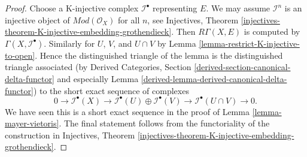 \documentclass[10pt,a4paper]{amsart}
\theoremstyle{plain}
\theoremstyle{definition}
\theoremstyle{remark}
\numberwithin{equation}{subsection}
\begin{document}
\begin{proof}
Choose a K-injective complex $\mathcal{I}^\bullet$
representing $E$. We may assume $\mathcal{I}^n$ is an injective
object of $\textit{Mod}(\mathcal{O}_X)$ for all $n$, see
Injectives, Theorem
\ref{injectives-theorem-K-injective-embedding-grothendieck}.
Then $R\Gamma(X, E)$ is computed by $\Gamma(X, \mathcal{I}^\bullet)$.
Similarly for $U$, $V$, and $U \cap V$ by
Lemma \ref{lemma-restrict-K-injective-to-open}.
Hence the distinguished triangle of the lemma is the distinguished
triangle associated (by
Derived Categories, Section
\ref{derived-section-canonical-delta-functor} and especially
Lemma \ref{derived-lemma-derived-canonical-delta-functor})
to the short exact sequence of complexes
$$
0 \to
\mathcal{I}^\bullet(X) \to
\mathcal{I}^\bullet(U) \oplus \mathcal{I}^\bullet(V) \to
\mathcal{I}^\bullet(U \cap V) \to
0.
$$
We have seen this is a short exact sequence in the proof of
Lemma \ref{lemma-mayer-vietoris}.
The final statement follows from the functoriality of the construction
in Injectives, Theorem
\ref{injectives-theorem-K-injective-embedding-grothendieck}.
\end{proof}
\end{document}
